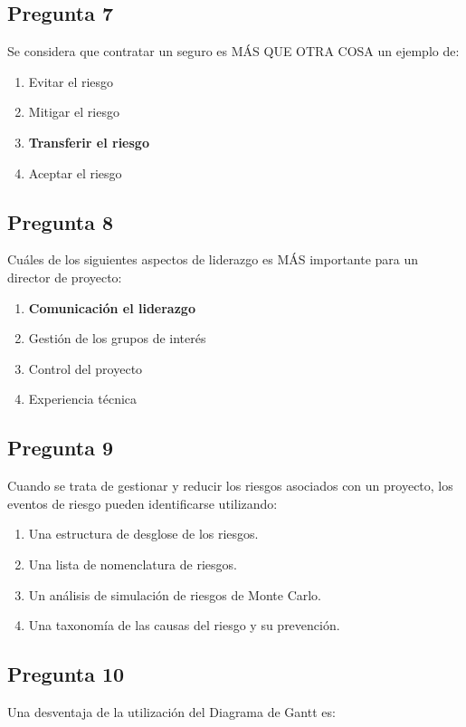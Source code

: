 \documentclass[11pt,a4paper]{article}
\begin{document}
\subsection*{Pregunta 7}
Se considera que contratar un seguro es MÁS QUE OTRA COSA un ejemplo de:

\begin{enumerate}[label=\alph*)]
  \item Evitar el riesgo
  \item Mitigar el riesgo
  \item \textbf{Transferir el riesgo}
  \item Aceptar el riesgo
\end{enumerate}

\subsection*{Pregunta 8}
Cuáles de los siguientes aspectos de liderazgo es MÁS importante para un director de proyecto:

\begin{enumerate}[label=\alph*)]
  \item \textbf{Comunicación el liderazgo}
  \item Gestión de los grupos de interés
  \item Control del proyecto
  \item Experiencia técnica
\end{enumerate}

\subsection*{Pregunta 9}
Cuando se trata de gestionar y reducir los riesgos asociados con un proyecto, los eventos de riesgo pueden identificarse utilizando:

\begin{enumerate}[label=\alph*)]
  \item Una estructura de desglose de los riesgos.
  \item Una lista de nomenclatura de riesgos.
  \item Un análisis de simulación de riesgos de Monte Carlo.
  \item Una taxonomía de las causas del riesgo y su prevención.
\end{enumerate}

\subsection*{Pregunta 10}
Una desventaja de la utilización del Diagrama de Gantt es:
\end{document}
